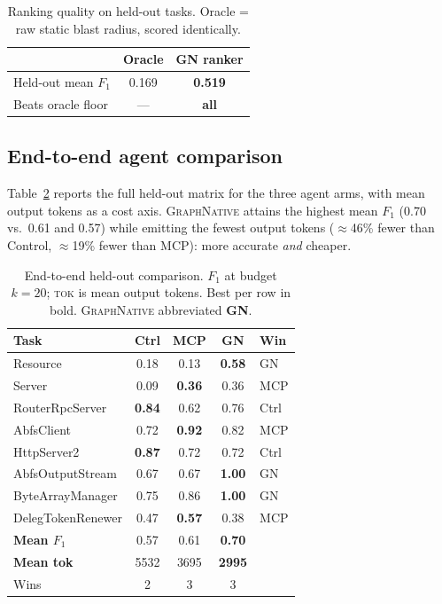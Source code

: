 \documentclass[11pt,twocolumn]{article}
\newcommand{\best}[1]{\textbf{#1}}
\newcommand{\sys}{{\normalfont\scshape GraphNative}}
\begin{document}
\begin{table}[t]\centering\small
\setlength{\tabcolsep}{5pt}
\caption{Ranking quality on held-out tasks. Oracle = raw static blast radius, scored
identically.}\label{tab:ranker}
\begin{tabular}{lcc}
\toprule
& Oracle & \best{GN ranker} \\
\midrule
Held-out mean $F_1$  & 0.169 & \best{0.519} \\
Beats oracle floor   & ---   & \best{all} \\
\bottomrule
\end{tabular}
\end{table}

\subsection{End-to-end agent comparison}
Table~\ref{tab:main} reports the full held-out matrix for the three agent arms, with mean output
tokens as a cost axis. \sys{} attains the highest mean $F_1$ (0.70 vs.\ 0.61 and 0.57) while
emitting the fewest output tokens ($\approx$46\% fewer than Control, $\approx$19\% fewer than
MCP): more accurate \emph{and} cheaper.

\begin{table}[t]\centering\small
\setlength{\tabcolsep}{4pt}
\caption{End-to-end held-out comparison. $F_1$ at budget $k{=}20$; \textsc{tok} is mean output
tokens. Best per row in bold. \sys{} abbreviated \textbf{GN}.}\label{tab:main}
\renewcommand{\arraystretch}{1.08}
\begin{tabular}{lcccl}
\toprule
Task & Ctrl & MCP & \best{GN} & Win \\
\midrule
Resource          & 0.18 & 0.13 & \best{0.58} & GN \\
Server            & 0.09 & \best{0.36} & 0.36 & MCP \\
RouterRpcServer   & \best{0.84} & 0.62 & 0.76 & Ctrl \\
AbfsClient        & 0.72 & \best{0.92} & 0.82 & MCP \\
HttpServer2       & \best{0.87} & 0.72 & 0.72 & Ctrl \\
AbfsOutputStream  & 0.67 & 0.67 & \best{1.00} & GN \\
ByteArrayManager  & 0.75 & 0.86 & \best{1.00} & GN \\
DelegTokenRenewer & 0.47 & \best{0.57} & 0.38 & MCP \\
\midrule
\best{Mean $F_1$} & 0.57 & 0.61 & \best{0.70} & \\
\best{Mean tok}   & 5532 & 3695 & \best{2995} & \\
Wins              & 2 & 3 & 3 & \\
\bottomrule
\end{tabular}
\end{table}
\end{document}
